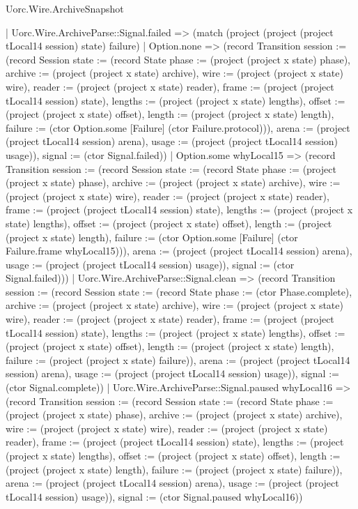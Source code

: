 \begin{lexlean}{Uorc.Wire.ArchiveSnapshot}
\begin{semanticmodule}
{      | Uorc.Wire.ArchiveParse::Signal.failed => (match (project (project (project tLocal14 session) state) failure)
        | Option.none => (record Transition {session := (record Session {state := (record State {phase := (project (project x state) phase), archive := (project (project x state) archive), wire := (project (project x state) wire), reader := (project (project x state) reader), frame := (project (project tLocal14 session) state), lengths := (project (project x state) lengths), offset := (project (project x state) offset), length := (project (project x state) length), failure := (ctor Option.some [Failure] (ctor Failure.protocol))}), arena := (project (project tLocal14 session) arena), usage := (project (project tLocal14 session) usage)}), signal := (ctor Signal.failed)})
        | Option.some whyLocal15 => (record Transition {session := (record Session {state := (record State {phase := (project (project x state) phase), archive := (project (project x state) archive), wire := (project (project x state) wire), reader := (project (project x state) reader), frame := (project (project tLocal14 session) state), lengths := (project (project x state) lengths), offset := (project (project x state) offset), length := (project (project x state) length), failure := (ctor Option.some [Failure] (ctor Failure.frame whyLocal15))}), arena := (project (project tLocal14 session) arena), usage := (project (project tLocal14 session) usage)}), signal := (ctor Signal.failed)}))
      | Uorc.Wire.ArchiveParse::Signal.clean => (record Transition {session := (record Session {state := (record State {phase := (ctor Phase.complete), archive := (project (project x state) archive), wire := (project (project x state) wire), reader := (project (project x state) reader), frame := (project (project tLocal14 session) state), lengths := (project (project x state) lengths), offset := (project (project x state) offset), length := (project (project x state) length), failure := (project (project x state) failure)}), arena := (project (project tLocal14 session) arena), usage := (project (project tLocal14 session) usage)}), signal := (ctor Signal.complete)})
      | Uorc.Wire.ArchiveParse::Signal.paused whyLocal16 => (record Transition {session := (record Session {state := (record State {phase := (project (project x state) phase), archive := (project (project x state) archive), wire := (project (project x state) wire), reader := (project (project x state) reader), frame := (project (project tLocal14 session) state), lengths := (project (project x state) lengths), offset := (project (project x state) offset), length := (project (project x state) length), failure := (project (project x state) failure)}), arena := (project (project tLocal14 session) arena), usage := (project (project tLocal14 session) usage)}), signal := (ctor Signal.paused whyLocal16)})
}
\end{semanticmodule}
\end{lexlean}

